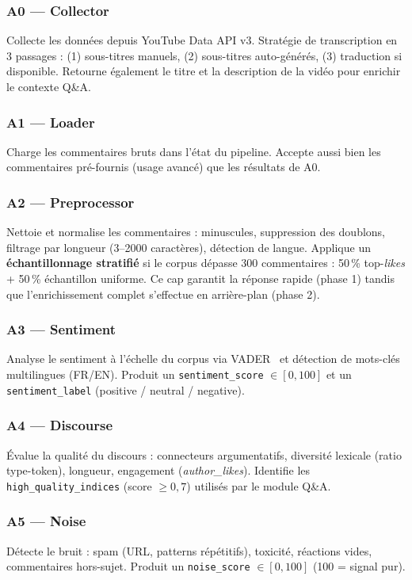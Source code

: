 \documentclass[12pt, a4paper]{article}
\begin{document}
\subsubsection{A0 — Collector}
Collecte les données depuis YouTube Data API v3. Stratégie de transcription en
3 passages : (1) sous-titres manuels, (2) sous-titres auto-générés,
(3) traduction si disponible. Retourne également le titre et la description
de la vidéo pour enrichir le contexte Q\&A.

\subsubsection{A1 — Loader}
Charge les commentaires bruts dans l'état du pipeline. Accepte aussi bien les
commentaires pré-fournis (usage avancé) que les résultats de A0.

\subsubsection{A2 — Preprocessor}
Nettoie et normalise les commentaires : minuscules, suppression des doublons,
filtrage par longueur (3--2000 caractères), détection de langue.
Applique un \textbf{échantillonnage stratifié} si le corpus dépasse 300 commentaires :
50\,\% top-\textit{likes} + 50\,\% échantillon uniforme. Ce cap garantit la
réponse rapide (phase 1) tandis que l'enrichissement complet s'effectue en
arrière-plan (phase 2).

\subsubsection{A3 — Sentiment}
Analyse le sentiment à l'échelle du corpus via VADER~\cite{hutto2014vader}
et détection de mots-clés multilingues (FR/EN). Produit un \texttt{sentiment\_score}
$\in [0, 100]$ et un \texttt{sentiment\_label} (positive / neutral / negative).

\subsubsection{A4 — Discourse}
Évalue la qualité du discours : connecteurs argumentatifs, diversité lexicale
(ratio type-token), longueur, engagement (\textit{author\_likes}). Identifie
les \texttt{high\_quality\_indices} (score $\geq 0{,}7$) utilisés par le module Q\&A.

\subsubsection{A5 — Noise}
Détecte le bruit : spam (URL, patterns répétitifs), toxicité, réactions vides,
commentaires hors-sujet. Produit un \texttt{noise\_score} $\in [0, 100]$
(100 = signal pur).
\end{document}
